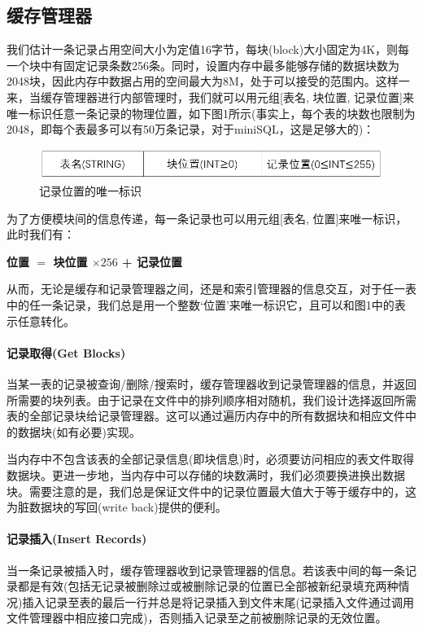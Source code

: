 \documentclass[UTF8]{ctexrep} %
\begin{document}
\subsection{缓存管理器}
我们估计一条记录占用空间大小为定值16字节，每块(block)大小固定为4K，则每一个块中有固定记录条数256条。同时，设置内存中最多能够存储的数据块数为2048块，因此内存中数据占用的空间最大为8M，处于可以接受的范围内。这样一来，当缓存管理器进行内部管理时，我们就可以用元组[表名, 块位置, 记录位置]来唯一标识任意一条记录的物理位置，如下图1所示(事实上，每个表的块数也限制为2048，即每个表最多可以有50万条记录，对于miniSQL，这是足够大的)：
\begin{figure}[H]
    \centering
    \includegraphics[width=0.75\linewidth]{figure/Position.jpg}
    \caption{记录位置的唯一标识}
    \label{fig:Position}
\end{figure}
为了方便模块间的信息传递，每一条记录也可以用元组[表名, 位置]来唯一标识，此时我们有：

\textbf{位置 $=$ 块位置 ${\times256}$ + 记录位置}

从而，无论是缓存和记录管理器之间，还是和索引管理器的信息交互，对于任一表中的任一条记录，我们总是用一个整数‘位置’来唯一标识它，且可以和图1中的表示任意转化。

\paragraph{记录取得(Get Blocks)}
当某一表的记录被查询/删除/搜索时，缓存管理器收到记录管理器的信息，并返回所需要的块列表。由于记录在文件中的排列顺序相对随机，我们设计选择返回所需表的全部记录块给记录管理器。这可以通过遍历内存中的所有数据块和相应文件中的数据块(如有必要)实现。

当内存中不包含该表的全部记录信息(即块信息)时，必须要访问相应的表文件取得数据块。更进一步地，当内存中可以存储的块数满时，我们必须要换进换出数据块。需要注意的是，我们总是保证文件中的记录位置最大值大于等于缓存中的，这为脏数据块的写回(write back)提供的便利。

\paragraph{记录插入(Insert Records)}
当一条记录被插入时，缓存管理器收到记录管理器的信息。若该表中间的每一条记录都是有效(包括无记录被删除过或被删除记录的位置已全部被新纪录填充两种情况)插入记录至表的最后一行并总是将记录插入到文件末尾(记录插入文件通过调用文件管理器中相应接口完成)，否则插入记录至之前被删除记录的无效位置。
\end{document}
